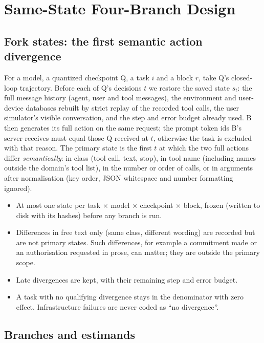 \section{Same-State Four-Branch Design}
\label{sec:fork}

\subsection{Fork states: the first semantic action divergence}
\label{sec:states}

For a model, a quantized checkpoint Q, a task $i$ and a block $r$, take Q's closed-loop trajectory. Before each of Q's decisions $t$ we restore the saved state $s_t$: the full message history (agent, user and tool messages), the environment and user-device databases rebuilt by strict replay of the recorded tool calls, the user simulator's visible conversation, and the step and error budget already used. B then generates its full action on the same request; the prompt token ids B's server receives must equal those Q received at $t$, otherwise the task is excluded with that reason. The primary state is the first $t$ at which the two full actions differ \emph{semantically}: in class (tool call, text, stop), in tool name (including names outside the domain's tool list), in the number or order of calls, or in arguments after normalisation (key order, JSON whitespace and number formatting ignored).
\begin{itemize}[leftmargin=*,itemsep=1pt,topsep=2pt]
\item At most one state per task $\times$ model $\times$ checkpoint $\times$ block, frozen (written to disk with its hashes) before any branch is run.
\item Differences in free text only (same class, different wording) are recorded but are not primary states. Such differences, for example a commitment made or an authorisation requested in prose, can matter; they are outside the primary scope.
\item Late divergences are kept, with their remaining step and error budget.
\item A task with no qualifying divergence stays in the denominator with zero effect. Infrastructure failures are never coded as ``no divergence''.
\end{itemize}

\subsection{Branches and estimands}
\label{sec:estimands}

